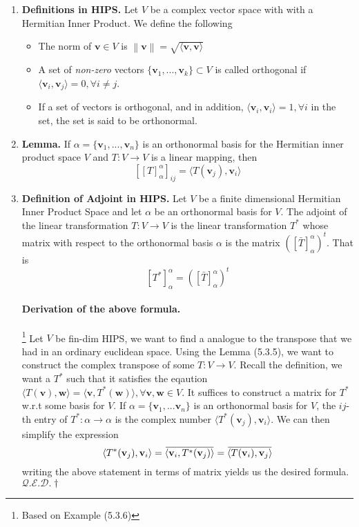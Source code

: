 \documentclass[oneside, 12pt]{book}
\newcommand{\settag}[1]{\renewcommand{\theenumi}{#1}}
\newcommand{\qed}{\hfill $\mathcal{Q}.\mathcal{E}.\mathcal{D}.\dagger$}
\newcommand{\tbf}[1]{\textbf{#1}}
\newcommand{\tit}[1]{\textit{#1}}
\newcommand{\overbar}[1]{\mkern 1.5mu\overline{\mkern-1.5mu#1\mkern-1.5mu}\mkern 1.5mu}
\newcommand{\trans}[3]{$#1:#2\rightarrow{}#3$}
\newcommand{\map}[3]{\text{$\left[#1\right]_{#2}^{#3}$}}
\newcommand{\norm}[1]{\left\lVert#1\right\rVert}
\newcommand{\para}[1]{\item \tbf{#1}}
\newcommand{\vv}{\mathbf{v}}
\newcommand{\vw}{\mathbf{w}}
\begin{document}
\begin{enumerate}
    \settag{5.3.3}
    \para{Definitions in HIPS.} Let $V$ be a complex vector space with with a Hermitian Inner Product. We define the following
    \begin{itemize}
        \item The norm of $\vv\in V$ is $\norm{\vv} = \sqrt{\langle \vv,\vv \rangle}$
        \item A set of \tit{non-zero} vectors $\{\vv_1,...,\vv_k\}\subset V$ is called orthogonal if $\langle \vv_i,\vv_j \rangle =0, \forall i\neq j$.
        \item If a set of vectors is orthogonal, and in addition, $\langle \vv_i,\vv_i \rangle = 1, \forall i$ in the set, the set is said to be orthonormal.
    \end{itemize}

    \settag{5.3.5}
    \para{Lemma.} If $\alpha = \{ \vv_1,...,\vv_n \}$ is an orthonormal basis for the Hermitian inner product space $V$ and \trans{T}{V}{V} is a linear mapping, then
    \begin{equation*}
        \left[ \map{T}{\alpha}{\alpha}\right]_{ij} = \langle T(\vv_j), \vv_i \rangle
    \end{equation*}

    \settag{5.3.7}
    \para{Definition of Adjoint in HIPS.} Let $V$ be a finite dimensional Hermitian Inner Product Space and let
    $\alpha$ be an orthonormal basis for $V$. The adjoint of the linear transformation \trans{T}{V}{V} is the linear
    transformation $T^*$ whose matrix with respect to the orthonormal basis $\alpha$ is the matrix $\left(\map{\bar{T}}{\alpha}{\alpha}\right)^t$. That is
    \begin{equation*}
        \map{T^*}{\alpha}{\alpha} = \left(\map{\bar{T}}{\alpha}{\alpha}\right)^t
    \end{equation*}
    \paragraph{Derivation of the above formula.}\footnote{Based on Example (5.3.6)} Let $V$ be fin-dim HIPS, we want to find a analogue to the
    transpose that we had in an ordinary euclidean space. Using the Lemma (5.3.5), we want to construct the complex transpose of some \trans{T}{V}{V}.
    Recall the definition, we want a $T^*$ such that it satisfies the eqaution $\langle T(\vv),\vw \rangle = \langle \vv,T^*(\vw) \rangle, \forall \vv,\vw \in V$.
    It suffices to construct a matrix for $T^*$ w.r.t some basis for $V$. If $\alpha = \{\vv_1,...\vv_n\}$ is an orthonormal basis for $V$, the $ij$-th entry of
    \trans{T^*}{\alpha}{\alpha} is the complex number $ \langle T^*(\vv_j),\vv_i\rangle $. We can then simplify the expression
    \begin{equation*}
        \langle T^*(\vv_j),\vv_i \rangle = \overbar{\langle \vv_i,T^*(\vv_j)\rangle} = \overbar{\langle T(\vv_i), \vv_j\rangle}
    \end{equation*}
    writing the above statement in terms of matrix yields us the desired formula. \qed


\end{enumerate}
\end{document}
